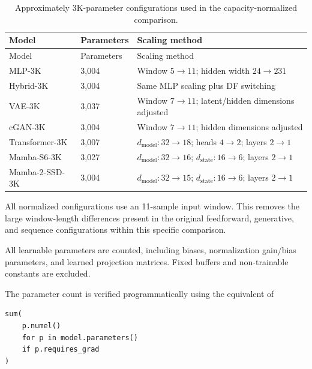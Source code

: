 \begin{longtable}[]{@{}lll@{}}
\caption[Normalized 3K-parameter model configurations]
{Approximately 3K-parameter configurations used in the
capacity-normalized comparison.}
\label{tbl:table28}\tabularnewline

\toprule
Model & Parameters & Scaling method \\
\midrule
\endfirsthead

\toprule
Model & Parameters & Scaling method \\
\midrule
\endhead

\bottomrule
\endlastfoot

MLP-3K
&
3,004
&
Window $5\rightarrow11$; hidden width $24\rightarrow231$
\\

Hybrid-3K
&
3,004
&
Same MLP scaling plus DF switching
\\

VAE-3K
&
3,037
&
Window $7\rightarrow11$; latent/hidden dimensions adjusted
\\

cGAN-3K
&
3,004
&
Window $7\rightarrow11$; hidden dimensions adjusted
\\

Transformer-3K
&
3,007
&
$d_{\mathrm{model}}:32\rightarrow18$;
heads $4\rightarrow2$;
layers $2\rightarrow1$
\\

Mamba-S6-3K
&
3,027
&
$d_{\mathrm{model}}:32\rightarrow16$;
$d_{\mathrm{state}}:16\rightarrow6$;
layers $2\rightarrow1$
\\

Mamba-2-SSD-3K
&
3,004
&
$d_{\mathrm{model}}:32\rightarrow15$;
$d_{\mathrm{state}}:16\rightarrow6$;
layers $2\rightarrow1$
\\

\end{longtable}

All normalized configurations use an 11-sample input window. This
removes the large window-length differences present in the original
feedforward, generative, and sequence configurations within this
specific comparison.

All learnable parameters are counted, including biases, normalization
gain/bias parameters, and learned projection matrices. Fixed buffers
and non-trainable constants are excluded.

The parameter count is verified programmatically using the equivalent
of

\begin{verbatim}
sum(
    p.numel()
    for p in model.parameters()
    if p.requires_grad
)
\end{verbatim}

